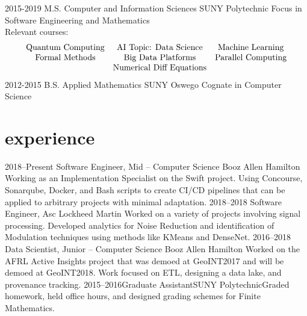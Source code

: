 \documentclass[]{twentysecondcv}
\begin{document}
\begin{twenty}
  \twentyitem
    {2015-2019}
    {M.S. Computer and Information Sciences}
    {SUNY Polytechnic}
    {Focus in Software Engineering and Mathematics \\
    \hspace*{-4em} Relevant courses:
      $$
      \begin{array}{ccc}
        \textmd{Quantum Computing} & \textmd{AI Topic: Data Science} & \textmd{Machine Learning} \\
        \textmd{Formal Methods} & \textmd{Big Data Platforms} & \textmd{Parallel Computing} \\
         & \textmd{Numerical Diff Equations} & 
      \end{array}
      $$}
  \twentyitem
    {2012-2015}
    {B.S. Applied Mathematics}
    {SUNY Oswego}
    {Cognate in Computer Science}
\end{twenty}


\section{experience}

\begin{twenty}
  \twentyitem
  {2018--\footnotesize Present}
  {Software Engineer, Mid -- Computer Science}
  {Booz Allen Hamilton}
  {Working as an Implementation Specialist on the Swift project. Using Concourse, Sonarqube, Docker, and Bash scripts to create CI/CD pipelines that can be applied to arbitrary projects with minimal adaptation.}
  \twentyitem
  {2018--2018}
  {Software Engineer, Asc}
  {Lockheed Martin}
  {Worked on a variety of projects involving signal processing. Developed analytics for Noise Reduction and identification of Modulation techniques using methods like KMeans and DenseNet.}
  \twentyitem
  {2016--2018}
  {Data Scientist, Junior -- Computer Science}
  {Booz Allen Hamilton}
  {Worked on the AFRL Active Insights project that was demoed at GeoINT2017 and will be demoed at GeoINT2018. Work focused on ETL, designing a data lake, and provenance tracking.}
  \twentyitem
  {2015--2016}{Graduate Assistant}{SUNY Polytechnic}{Graded homework, held office hours, and designed grading schemes for Finite Mathematics.}

\end{twenty}
\end{document}
